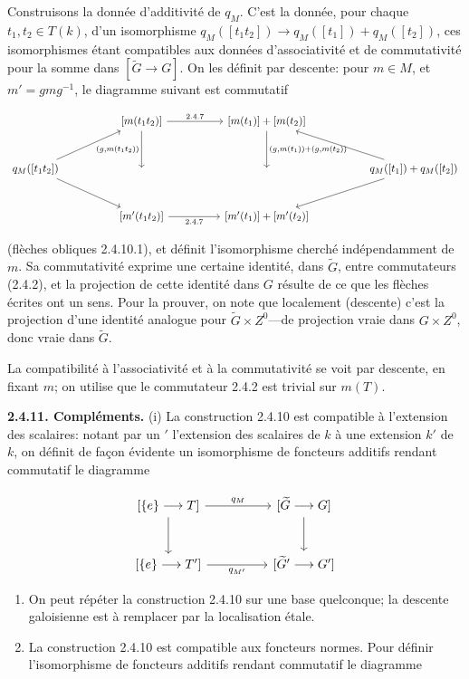 \documentclass[10pt,a4paper]{article}
\begin{document}
Construisons la donnée d'additivité de \(q_M\). C'est la donnée, pour chaque \(t_1,t_2\in T(k)\), d'un isomorphisme \(q_M([t_1t_2])\to q_M([t_1])+q_M([t_2])\), ces isomorphismes étant compatibles aux données d'associativité et de commutativité pour la somme dans \([\widetilde G\to G]\). On les définit par descente: pour \(m\in M\), et \(m'=gmg^{-1}\), le diagramme suivant est commutatif

\[
\begin{tikzcd}[column sep=huge,row sep=large]
& {[m(t_1t_2)]} \arrow[r,"2.4.7"] \arrow[d,"{(g,m(t_1t_2))}"'] & {[m(t_1)]+[m(t_2)]} \arrow[d,"{(g,m(t_1))+(g,m(t_2))}"] & \\
q_M([t_1t_2]) \arrow[ur] \arrow[dr] & {} & {} & q_M([t_1])+q_M([t_2]) \arrow[ul] \arrow[dl] \\
& {[m'(t_1t_2)]} \arrow[r,"2.4.7"'] & {[m'(t_1)]+[m'(t_2)]} &
\end{tikzcd}
\]

(flèches obliques 2.4.10.1), et définit l'isomorphisme cherché indépendamment de \(m\). Sa commutativité exprime une certaine identité, dans \(\widetilde G\), entre commutateurs (2.4.2), et la projection de cette identité dans \(G\) résulte de ce que les flèches écrites ont un sens. Pour la prouver, on note que localement (descente) c'est la projection d'une identité analogue pour \(\widetilde G\times Z^0\)---de projection vraie dans \(G\times Z^0\), donc vraie dans \(\widetilde G\).

La compatibilité à l'associativité et à la commutativité se voit par descente, en fixant \(m\); on utilise que le commutateur 2.4.2 est trivial sur \(m(T)\).

\textbf{2.4.11. Compléments.} (i) La construction 2.4.10 est compatible à l'extension des scalaires: notant par un \('\) l'extension des scalaires de \(k\) à une extension \(k'\) de \(k\), on définit de façon évidente un isomorphisme de foncteurs additifs rendant commutatif le diagramme

\[
\begin{tikzcd}[column sep=huge,row sep=large]
{[\{e\}\longrightarrow T]} \arrow[r,"q_M"] \arrow[d] & {[\widetilde G\longrightarrow G]} \arrow[d] \\
{[\{e\}\longrightarrow T']} \arrow[r,"q_{M'}"'] & {[\widetilde G'\longrightarrow G']}
\end{tikzcd}
\]

\begin{enumerate}
\def\labelenumi{(\roman{enumi})}
\setcounter{enumi}{1}
\item
  On peut répéter la construction 2.4.10 sur une base quelconque; la descente galoisienne est à remplacer par la localisation étale.
\item
  La construction 2.4.10 est compatible aux foncteurs normes. Pour définir l'isomorphisme de foncteurs additifs rendant commutatif le diagramme
\end{enumerate}
\end{document}
